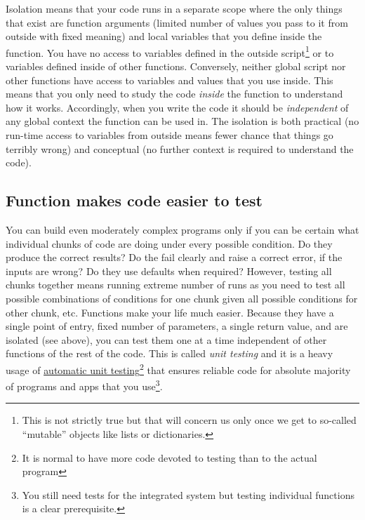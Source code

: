\documentclass[
]{book}
\begin{document}
Isolation means that your code runs in a separate scope where the only things that exist are function arguments (limited number of values you pass to it from outside with fixed meaning) and local variables that you define inside the function. You have no access to variables defined in the outside script\footnote{This is not strictly true but that will concern us only once we get to so-called ``mutable'' objects like lists or dictionaries.} or to variables defined inside of other functions. Conversely, neither global script nor other functions have access to variables and values that you use inside. This means that you only need to study the code \emph{inside} the function to understand how it works. Accordingly, when you write the code it should be \emph{independent} of any global context the function can be used in. The isolation is both practical (no run-time access to variables from outside means fewer chance that things go terribly wrong) and conceptual (no further context is required to understand the code).

\hypertarget{function-makes-code-easier-to-test}{%
\subsection{Function makes code easier to test}\label{function-makes-code-easier-to-test}}

You can build even moderately complex programs only if you can be certain what individual chunks of code are doing under every possible condition. Do they produce the correct results? Do the fail clearly and raise a correct error, if the inputs are wrong? Do they use defaults when required? However, testing all chunks together means running extreme number of runs as you need to test all possible combinations of conditions for one chunk given all possible conditions for other chunk, etc. Functions make your life much easier. Because they have a single point of entry, fixed number of parameters, a single return value, and are isolated (see above), you can test them one at a time independent of other functions of the rest of the code. This is called \emph{unit testing} and it is a heavy usage of \href{https://docs.python.org/3/library/unittest.html}{automatic unit testing}\footnote{It is normal to have more code devoted to testing than to the actual program} that ensures reliable code for absolute majority of programs and apps that you use\footnote{You still need tests for the integrated system but testing individual functions is a clear prerequisite.}.
\end{document}
